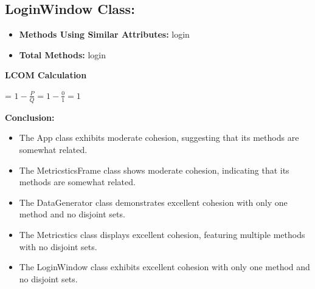 {{{\subsection*{LoginWindow Class: }
\begin{itemize}
    \item \textbf{Methods Using Similar Attributes:} login
    \item \textbf{Total Methods:} login
    \linebreak
\end{itemize}

 \textbf{LCOM Calculation}} = $1  - \frac{P}{Q} = 1 - \frac{0}{1} = 1$ \linebreak \linebreak


\pagebreak
\textbf{\normalsize{Conclusion:  \\}}
\normalsize{
\begin{itemize}
\item \normalsize{ The App class exhibits moderate cohesion, suggesting that its methods are somewhat related.}
\item \normalsize{The MetricsticsFrame class shows moderate cohesion, indicating that its methods are somewhat related.}
\item \normalsize{The DataGenerator class demonstrates excellent cohesion with only one method and no disjoint sets.}
\item \normalsize{ The Metricstics class displays excellent cohesion, featuring multiple methods with no disjoint sets.}
\item \normalsize{The LoginWindow class exhibits excellent cohesion with only one method and no disjoint sets.}

\end{itemize}

}}}
